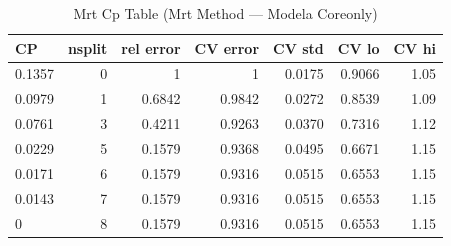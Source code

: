 \begin{table}[htbp]
  \centering
  \caption{Mrt Cp Table (Mrt Method — Modela Coreonly)}
  \label{tab:MRT_Method_ModelA_CoreOnly_tables_mrt_cp_table}
  \small
  \begin{tabular}{lrrrrrr}
    \toprule
    CP & nsplit & rel error & CV error & CV std & CV lo & CV hi \\
    \midrule
    0.1357 & 0 & 1 & 1 & 0.0175 & 0.9066 & 1.05 \\
    0.0979 & 1 & 0.6842 & 0.9842 & 0.0272 & 0.8539 & 1.09 \\
    0.0761 & 3 & 0.4211 & 0.9263 & 0.0370 & 0.7316 & 1.12 \\
    0.0229 & 5 & 0.1579 & 0.9368 & 0.0495 & 0.6671 & 1.15 \\
    0.0171 & 6 & 0.1579 & 0.9316 & 0.0515 & 0.6553 & 1.15 \\
    0.0143 & 7 & 0.1579 & 0.9316 & 0.0515 & 0.6553 & 1.15 \\
    0 & 8 & 0.1579 & 0.9316 & 0.0515 & 0.6553 & 1.15 \\
    \bottomrule
  \end{tabular}
\end{table}
